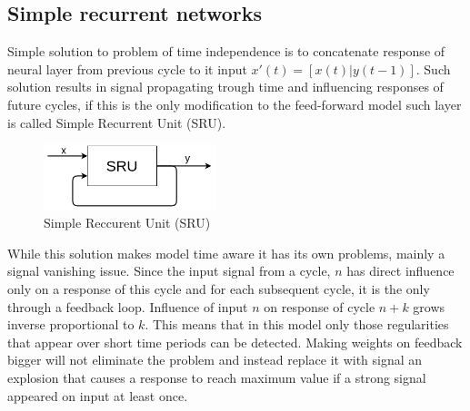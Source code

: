 \subsection{Simple recurrent networks}
Simple solution to problem of time independence is to concatenate response of neural layer
from previous cycle to it input $x'(t)=[x(t)|y(t-1)]$.
Such solution results in signal propagating trough time and influencing responses of future cycles,
if this is the only modification to the feed-forward model such layer is called Simple Recurrent
Unit (SRU).
\begin{figure}[h] 
	\centering
	\includegraphics[width=5cm]{res/sru}
	\caption{Simple Reccurent Unit (SRU)}
	\label{fig:sru}
\end{figure}
While this solution makes model time aware it has its own problems, mainly a signal vanishing
issue. Since the input signal from a cycle, $n$ has direct influence only on a response of this
cycle and for each subsequent cycle, it is the only through a feedback loop.
Influence of input $n$ on response of cycle $n+k$ grows inverse proportional to $k$.
This means that in this model only those regularities that appear over short time periods can
be detected.
Making weights on feedback bigger will not eliminate the problem and instead replace it with signal
an explosion that causes a response to reach maximum value if a strong signal appeared on input at
least once.

